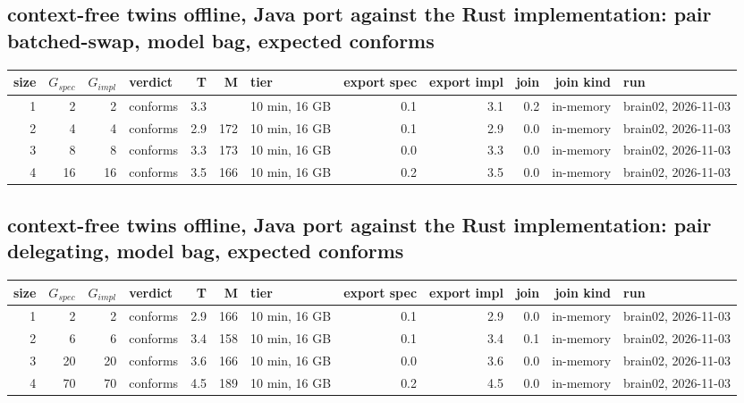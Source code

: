 \documentclass[10pt]{article}
\begin{document}
\subsection*{context-free twins offline, Java port against the Rust implementation: pair \textsf{batched-swap}, model bag, expected conforms}
\begin{longtable}{@{}rrrlrrlrrrrl@{}}
\toprule
size & $G_{\mathit{spec}}$ & $G_{\mathit{impl}}$ & verdict & T & M & tier & export spec & export impl & join & join kind & run \\
\midrule
\endhead
\color{red} 1 & 2 & 2 & conforms & 3.3 &  & 10 min, 16 GB & 0.1 & 3.1 & 0.2 & in-memory & brain02, 2026-11-03 \\
\color{red} 2 & 4 & 4 & conforms & 2.9 & 172 & 10 min, 16 GB & 0.1 & 2.9 & 0.0 & in-memory & brain02, 2026-11-03 \\
\color{red} 3 & 8 & 8 & conforms & 3.3 & 173 & 10 min, 16 GB & 0.0 & 3.3 & 0.0 & in-memory & brain02, 2026-11-03 \\
\color{red} 4 & 16 & 16 & conforms & 3.5 & 166 & 10 min, 16 GB & 0.2 & 3.5 & 0.0 & in-memory & brain02, 2026-11-03 \\
\bottomrule
\end{longtable}
\subsection*{context-free twins offline, Java port against the Rust implementation: pair \textsf{delegating}, model bag, expected conforms}
\begin{longtable}{@{}rrrlrrlrrrrl@{}}
\toprule
size & $G_{\mathit{spec}}$ & $G_{\mathit{impl}}$ & verdict & T & M & tier & export spec & export impl & join & join kind & run \\
\midrule
\endhead
\color{red} 1 & 2 & 2 & conforms & 2.9 & 166 & 10 min, 16 GB & 0.1 & 2.9 & 0.0 & in-memory & brain02, 2026-11-03 \\
\color{red} 2 & 6 & 6 & conforms & 3.4 & 158 & 10 min, 16 GB & 0.1 & 3.4 & 0.1 & in-memory & brain02, 2026-11-03 \\
\color{red} 3 & 20 & 20 & conforms & 3.6 & 166 & 10 min, 16 GB & 0.0 & 3.6 & 0.0 & in-memory & brain02, 2026-11-03 \\
\color{red} 4 & 70 & 70 & conforms & 4.5 & 189 & 10 min, 16 GB & 0.2 & 4.5 & 0.0 & in-memory & brain02, 2026-11-03 \\
\bottomrule
\end{longtable}
\end{document}
